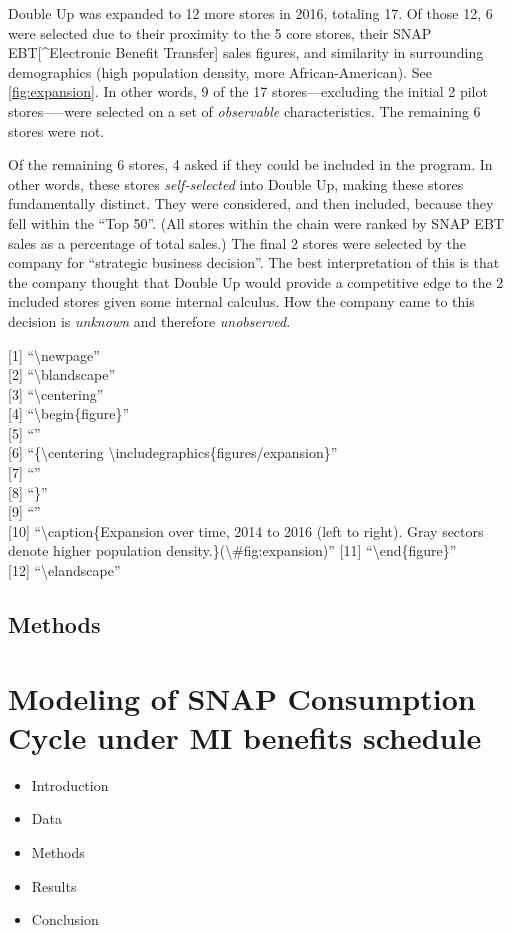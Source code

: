 \documentclass[11pt,letterpaperpaper,]{book}
\providecommand{\tightlist}{%
  \setlength{\itemsep}{0pt}\setlength{\parskip}{0pt}}
\begin{document}
Double Up was expanded to 12 more stores in 2016, totaling 17. Of those
12, 6 were selected due to their proximity to the 5 core stores, their
SNAP EBT{[}\^{}Electronic Benefit Transfer{]} sales figures, and
similarity in surrounding demographics (high population density, more
African-American). See \ref{fig:expansion}. In other words, 9 of the 17
stores---excluding the initial 2 pilot stores-----were selected on a set
of \emph{observable} characteristics. The remaining 6 stores were not.

Of the remaining 6 stores, 4 asked if they could be included in the
program. In other words, these stores \emph{self-selected} into Double
Up, making these stores fundamentally distinct. They were considered,
and then included, because they fell within the ``Top 50''. (All stores
within the chain were ranked by SNAP EBT sales as a percentage of total
sales.) The final 2 stores were selected by the company for ``strategic
business decision''. The best interpretation of this is that the company
thought that Double Up would provide a competitive edge to the 2
included stores given some internal calculus. How the company came to
this decision is \emph{unknown} and therefore \emph{unobserved}.

{[}1{]} ``\textbackslash{}newpage''\\
{[}2{]} ``\textbackslash{}blandscape''\\
{[}3{]} ``\textbackslash{}centering''\\
{[}4{]} ``\textbackslash{}begin\{figure\}''\\
{[}5{]} ``''\\
{[}6{]} ``\{\textbackslash{}centering
\textbackslash{}includegraphics\{figures/expansion\}''\\
{[}7{]} ``''\\
{[}8{]} ``\}''\\
{[}9{]} ``''\\
{[}10{]} ``\textbackslash{}caption\{Expansion over time, 2014 to 2016
(left to right). Gray sectors denote higher population
density.\}(\textbackslash{}\#fig:expansion)'' {[}11{]}
``\textbackslash{}end\{figure\}''\\
{[}12{]} ``\textbackslash{}elandscape''

\hypertarget{methods}{\section{Methods}\label{methods}}

\chapter{Modeling of SNAP Consumption Cycle under MI benefits
schedule}\label{snap-consumption}

\begin{itemize}
\tightlist
\item
  Introduction
\item
  Data
\item
  Methods
\item
  Results
\item
  Conclusion
\end{itemize}


\end{document}
